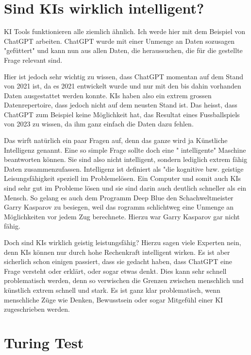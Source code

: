 \documentclass{report}
\begin{document}
\section{Sind KIs wirklich intelligent?}
KI Tools funktionieren alle ziemlich ähnlich. Ich werde hier mit dem Beispiel von ChatGPT arbeiten. ChatGPT wurde mit einer Unmenge an Daten sozusagen "gefüttert" und kann nun aus allen Daten, die heraussuchen, die für die gestellte Frage relevant sind.
\par
Hier ist jedoch sehr wichtig zu wissen, dass ChatGPT momentan auf dem Stand von 2021 ist, da es 2021 entwickelt wurde und nur mit den bis dahin vorhanden Daten ausgestattet werden konnte. KIs haben also ein extrem grossen Datenrepertoire, dass jedoch nicht auf dem neusten Stand ist. Das heisst, dass ChatGPT zum Beispiel keine Möglichkeit hat, das Resultat eines Fussballspiels von 2023 zu wissen, da ihm ganz einfach die Daten dazu fehlen.
\par
Das wirft natürlich ein paar Fragen auf, denn das ganze wird ja Künstliche Intelligenz genannt. Eine so simple Frage sollte doch eine " intelligente" Maschine beantworten können. Sie sind also nicht intelligent, sondern lediglich extrem fähig Daten zusammenzufassen. Intelligenz ist definiert als "die kognitive bzw. geistige Leisungsfähigkeit speziell im Problemelösen. Ein Computer und somit auch KIs sind sehr gut im Probleme lösen und sie sind darin auch deutlich schneller als ein Mensch. So gelang es auch dem Programm Deep Blue den Schachweltmeister Garry Kasparov zu besiegen, weil  das rogramm schlichtweg eine Unmenge an Möglichkeiten vor jedem Zug berechnete. Hierzu war Garry Kasparov gar nicht fähig.
\par 
Doch sind KIs wirklich geistig leistungsfähig? Hierzu sagen viele Experten nein, denn KIs können nur durch hohe Rechenkraft intelligent wirken. Es ist aber sicherlich schon einigen passiert, dass sie gedacht haben, dass ChatGPT eine Frage versteht oder erklärt, oder sogar etwas denkt. Dies kann sehr schnell problematisch werden, denn so verwischen die Grenzen zwischen menschlich und künstlich extrem schnell und stark. Es ist ganz klar problematisch, wenn menschliche Züge wie Denken, Bewusstsein oder sogar Mitgefühl einer KI zugeschrieben werden. 

\section{Turing Test}
\end{document}
